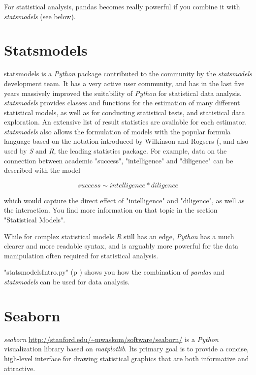 For statistical analysis, pandas becomes really powerful if you combine it with \emph{statsmodels} (see below).

\section{Statsmodels}

\href{http://statsmodels.sourceforge.net/.}{statsmodels} is a \emph{Python} package contributed to the community by the \emph{statsmodels} development team. It has a very active user community, and has in the last five years massively improved the suitability of \emph{Python} for statistical data analysis. \emph{statsmodels} provides classes and functions for the estimation of many different statistical models, as well as for conducting statistical tests, and statistical data exploration. An extensive list of result statistics are available for each estimator. \emph{statsmodels} also allows the formulation of models with the popular formula language based on the notation introduced by Wilkinson and Rogsers (\cite{Wilkinson1973}, and also used by \emph{S} and \emph{R}, the leading statistics package. For example, data on the connection between academic "success", "intelligence" and "diligence" can be described with the model

\begin{equation*}
    success \sim intelligence * diligence
\end{equation*}

which would capture the direct effect of "intelligence" and "diligence", as well as the interaction. You find more information on that topic in the section "Statistical Models".

While for complex statistical models \emph{R} still has an edge, \emph{Python} has a much clearer and more readable syntax, and is arguably more powerful for the data manipulation often required for statistical analysis.

\PyImg "statsmodelsIntro.py" (p \pageref{py:statsmodelsIntro}) shows you how the combination of \emph{pandas} and \emph{statsmodels} can be used for data analysis.

\section{Seaborn}

\emph{seaborn} \url{http://stanford.edu/~mwaskom/software/seaborn/} is a \emph{Python} visualization library based on \emph{matplotlib}. Its primary goal is to provide a concise, high-level interface for drawing statistical graphics that are both informative and attractive.

